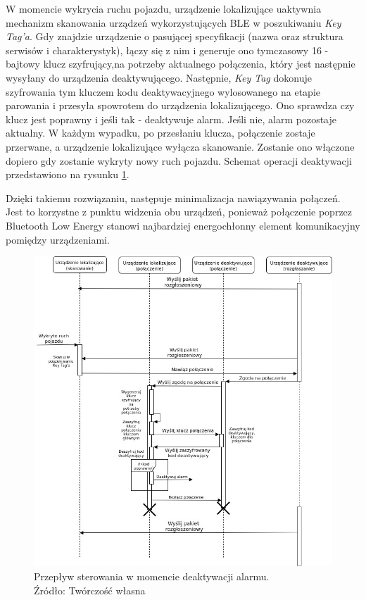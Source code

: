 W momencie wykrycia ruchu pojazdu, urządzenie lokalizujące uaktywnia mechanizm skanowania urządzeń wykorzystujących BLE w poszukiwaniu \textit{Key Tag'a}. Gdy znajdzie urządzenie o pasującej specyfikacji (nazwa oraz struktura serwisów i charakterystyk), łączy się z nim i generuje ono tymczasowy 16 - bajtowy klucz szyfrujący,na potrzeby aktualnego połączenia, który jest następnie wysyłany do urządzenia deaktywującego. Następnie, \textit{Key Tag} dokonuje szyfrowania tym kluczem kodu deaktywacyjnego wylosowanego na etapie parowania i przesyła spowrotem do urządzenia lokalizującego. Ono sprawdza czy klucz jest poprawny i jeśli tak - deaktywuje alarm. Jeśli nie, alarm pozostaje aktualny. W każdym wypadku, po przesłaniu klucza, połączenie zostaje przerwane, a urządzenie lokalizujące wyłącza skanowanie. Zostanie ono włączone dopiero gdy zostanie wykryty  nowy ruch pojazdu. Schemat operacji deaktywacji przedstawiono na rysunku \ref{fig:image_soft_keytag_alarm_deactivation}.

Dzięki takiemu rozwiązaniu, następuje minimalizacja nawiązywania połączeń. Jest to korzystne z punktu widzenia obu urządzeń, ponieważ połączenie poprzez Bluetooth Low Energy stanowi najbardziej energochłonny element komunikacyjny pomiędzy urządzeniami.  

\begin{figure}[H]
	\centering
	\includegraphics[width=17cm]{img/software/keytag/alarm_deactivation.jpg}
	\caption{Przepływ sterowania w momencie deaktywacji alarmu. 
	\\Źródło: Twórczość własna}
	\label{fig:image_soft_keytag_alarm_deactivation}
\end{figure}